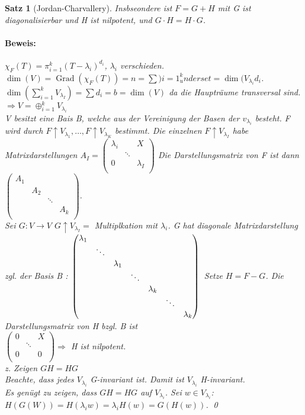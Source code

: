 \documentclass{report}
\newcommand{\lb}{\lambda}
\DeclareMathOperator{\Grad}{Grad}
\theoremstyle{customrem}
\theoremstyle{customdef}
\newtheorem{satz}[definition]{Satz}
\renewenvironment{proof}{\paragraph{Beweis: }}{\qed}
\theoremstyle{customenv}
\begin{document}
\begin{satz}[Jordan-Charvallery]
  Insbseondere ist \(F = G + H\) mit G ist diagonalisierbar und H ist nilpotent,
  und \(G \cdot H = H \cdot G\).
  \begin{proof}
    \(\chi_F(T) = \pi_{i=1}^k (T-\lb_i)^{d_i}\), \(\lb_i\) verschieden.\\
    \(\dim(V) = \Grad(\chi_F(T)) = n = \sum){i=1}^k _underset{=\dim(V_{\lb_i}}{d_i}\).\\
    \(\dim(\sum_{i=1}^kV_{\lb_I}) = \sum d_i = b = \dim(V)\) da die Hauptr\"aume transversal sind.\\
    \(\Rightarrow V = \oplus_{i=1}^k V_{\lb_i}\)\\
    V besitzt eine Bais B, welche aus der Vereinigung der Basen der \(v_{\lb_i}\)
    besteht. F wird durch \(F \uparrow V_{\lb_1}, \dots, F\uparrow V_{\lb_K}\)
    bestimmt. Die einzelnen \(F \uparrow V_{\lb_I}\) habe Matrixdarstellungen
    \(A_I = \begin{pmatrix}
      \lb_i&&X\\
      &\ddots\\
      0&&\lb_I\\
    \end{pmatrix}\)
    Die Darstellungsmatrix von F ist dann \\
    \(
      \begin{pmatrix}
      A_1\\
          & A_2\\
          &       &\ddots\\
          &&&A_k\\
      \end{pmatrix}
    \).\\
    Sei \(G : V \to V\) \(G \uparrow V_{\lb_I} = \) Multiplkation mit \(\lb_i\).
    G hat diagonale Matrixdarstellung zgl. der Basis B :
    \(
    \begin{pmatrix}
      \lb_1\\
      &\ddots\\
      &&\lb_1\\
      &&&\ddots\\
      &&&&\lb_k\\
      &&&&&\ddots\\
      &&&&&&\lb_k
    \end{pmatrix}\\
    \)
    Setze \(H = F - G\). Die Darstellungsmatrix von H bzgl. B ist\\
    \(
    \begin{pmatrix}
      0&&X\\
      &\ddots\\
      0&&0\\
    \end{pmatrix} \Rightarrow
    \) H ist nilpotent.\\
    z. Zeigen \(G H = H G\)\\
    Beachte, dass jedes \(V_{\lb_i}\) G-invariant ist. Damit ist \(V_{\lb_i}\)
    H-invariant.\\
    Es gen\"ugt zu zeigen, dass \(G H = H G\) auf \(V_{\lb_i}\). Sei
    \(w \in V_{\lb_i}\): \(H(G(W)) = H(\lb_i w) = \lb_i H(w) = G(H(w))\).
  \end{proof}
\end{satz}
\end{document}
